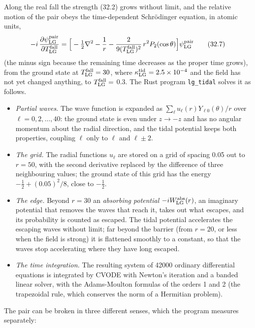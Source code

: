 \documentclass[
  10pt,
]{article}
\providecommand{\tightlist}{%
  \setlength{\itemsep}{0pt}\setlength{\parskip}{0pt}}
\begin{document}
Along the real fall the strength (32.2) grows without limit, and the
relative motion of the pair obeys the time-dependent Schrödinger
equation, in atomic units,
\[-i\,\frac{\partial\psi^{\rm pair}_{\rm LG}}{\partial T^{\rm fall}_{\rm LG}}=\Big[-\tfrac12\nabla^2-\frac1r-\frac{2}{9(T^{\rm fall}_{\rm LG})^2}\,r^2P_2(\cos\theta)\Big]\psi^{\rm pair}_{\rm LG}\tag{32.7}\]
(the minus sign because the remaining time decreases as the proper time
grows), from the ground state at \(T^{\rm fall}_{\rm LG}=30\), where
\(\kappa^{\rm tid}_{\rm LG}=2.5\times10^{-4}\) and the field has not yet
changed anything, to \(T^{\rm fall}_{\rm LG}=\) \(0.3\). The Rust
program \texttt{lg\_tidal} solves it as follows.

\begin{itemize}
\tightlist
\item
  \emph{Partial waves.} The wave function is expanded as
  \(\sum_\ell u_\ell(r)Y_{\ell0}(\theta)/r\) over \(\ell=0,2,\dots,40\):
  the ground state is even under \(z\to-z\) and has no angular momentum
  about the radial direction, and the tidal potential keeps both
  properties, coupling \(\ell\) only to \(\ell\) and \(\ell\pm2\).
\item
  \emph{The grid.} The radial functions \(u_\ell\) are stored on a grid
  of spacing 0.05 out to \(r=50\), with the second derivative replaced
  by the difference of three neighbouring values; the ground state of
  this grid has the energy \(-\tfrac12+(0.05)^2/8\), close to
  \(-\tfrac12\).
\item
  \emph{The edge.} Beyond \(r=30\) an \emph{absorbing potential}
  \(-iW^{\rm abs}_{\rm LG}(r)\), an imaginary potential that removes the
  waves that reach it, takes out what escapes, and its probability is
  counted as escaped. The tidal potential accelerates the escaping waves
  without limit; far beyond the barrier (from \(r=20\), or less when the
  field is strong) it is flattened smoothly to a constant, so that the
  waves stop accelerating where they have long escaped.
\item
  \emph{The time integration.} The resulting system of 42000 ordinary
  differential equations is integrated by CVODE with Newton's iteration
  and a banded linear solver, with the Adams-Moulton formulas of the
  orders 1 and 2 (the trapezoidal rule, which conserves the norm of a
  Hermitian problem).
\end{itemize}

The pair can be broken in three different senses, which the program
measures separately:
\end{document}
